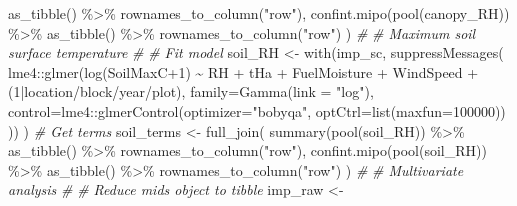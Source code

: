 \documentclass[
]{article}
\newenvironment{Shaded}{\begin{snugshade}}{\end{snugshade}}
\newcommand{\AttributeTok}[1]{\textcolor[rgb]{0.77,0.63,0.00}{#1}}
\newcommand{\CommentTok}[1]{\textcolor[rgb]{0.56,0.35,0.01}{\textit{#1}}}
\newcommand{\DecValTok}[1]{\textcolor[rgb]{0.00,0.00,0.81}{#1}}
\newcommand{\FunctionTok}[1]{\textcolor[rgb]{0.00,0.00,0.00}{#1}}
\newcommand{\NormalTok}[1]{#1}
\newcommand{\OtherTok}[1]{\textcolor[rgb]{0.56,0.35,0.01}{#1}}
\newcommand{\SpecialCharTok}[1]{\textcolor[rgb]{0.00,0.00,0.00}{#1}}
\newcommand{\StringTok}[1]{\textcolor[rgb]{0.31,0.60,0.02}{#1}}
\begin{document}
\begin{Shaded}
\begin{Highlighting}[]
          \FunctionTok{as\_tibble}\NormalTok{() }\SpecialCharTok{\%\textgreater{}\%}
          \FunctionTok{rownames\_to\_column}\NormalTok{(}\StringTok{"row"}\NormalTok{), }
        \FunctionTok{confint.mipo}\NormalTok{(}\FunctionTok{pool}\NormalTok{(canopy\_RH)) }\SpecialCharTok{\%\textgreater{}\%}
          \FunctionTok{as\_tibble}\NormalTok{() }\SpecialCharTok{\%\textgreater{}\%}
          \FunctionTok{rownames\_to\_column}\NormalTok{(}\StringTok{"row"}\NormalTok{) ) }
\CommentTok{\#}
\CommentTok{\# Maximum soil surface temperature  }
\CommentTok{\#}
  \CommentTok{\# Fit model }
\NormalTok{    soil\_RH }\OtherTok{\textless{}{-}} 
      \FunctionTok{with}\NormalTok{(imp\_sc, }\FunctionTok{suppressMessages}\NormalTok{(}
\NormalTok{            lme4}\SpecialCharTok{::}\FunctionTok{glmer}\NormalTok{(}\FunctionTok{log}\NormalTok{(SoilMaxC}\SpecialCharTok{+}\DecValTok{1}\NormalTok{) }\SpecialCharTok{\textasciitilde{}}\NormalTok{ RH }\SpecialCharTok{+}\NormalTok{ tHa }\SpecialCharTok{+}
\NormalTok{                        FuelMoisture }\SpecialCharTok{+}\NormalTok{ WindSpeed }\SpecialCharTok{+}
\NormalTok{                        (}\DecValTok{1}\SpecialCharTok{|}\NormalTok{location}\SpecialCharTok{/}\NormalTok{block}\SpecialCharTok{/}\NormalTok{year}\SpecialCharTok{/}\NormalTok{plot), }
              \AttributeTok{family=}\FunctionTok{Gamma}\NormalTok{(}\AttributeTok{link =} \StringTok{"log"}\NormalTok{), }
              \AttributeTok{control=}\NormalTok{lme4}\SpecialCharTok{::}\FunctionTok{glmerControl}\NormalTok{(}\AttributeTok{optimizer=}\StringTok{"bobyqa"}\NormalTok{, }
                            \AttributeTok{optCtrl=}\FunctionTok{list}\NormalTok{(}\AttributeTok{maxfun=}\DecValTok{100000}\NormalTok{)) )) )}
  \CommentTok{\# Get terms}
\NormalTok{    soil\_terms }\OtherTok{\textless{}{-}} 
      \FunctionTok{full\_join}\NormalTok{(}
        \FunctionTok{summary}\NormalTok{(}\FunctionTok{pool}\NormalTok{(soil\_RH)) }\SpecialCharTok{\%\textgreater{}\%} 
          \FunctionTok{as\_tibble}\NormalTok{() }\SpecialCharTok{\%\textgreater{}\%}
          \FunctionTok{rownames\_to\_column}\NormalTok{(}\StringTok{"row"}\NormalTok{), }
        \FunctionTok{confint.mipo}\NormalTok{(}\FunctionTok{pool}\NormalTok{(soil\_RH)) }\SpecialCharTok{\%\textgreater{}\%}
          \FunctionTok{as\_tibble}\NormalTok{() }\SpecialCharTok{\%\textgreater{}\%}
          \FunctionTok{rownames\_to\_column}\NormalTok{(}\StringTok{"row"}\NormalTok{) ) }
\CommentTok{\#}
\CommentTok{\# Multivariate analysis}
\CommentTok{\#}
  \CommentTok{\# Reduce mids object to tibble   }
\NormalTok{    imp\_raw }\OtherTok{\textless{}{-}} 

\end{Highlighting}
\end{Shaded}
\end{document}
